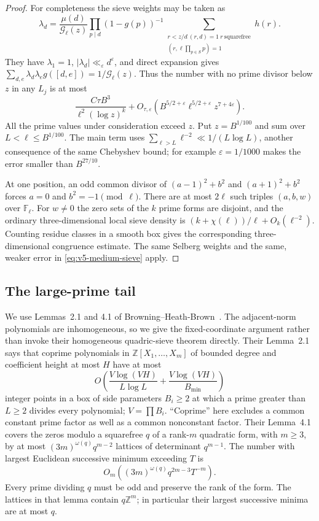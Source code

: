 \documentclass[11pt]{article}
\theoremstyle{definition}
\theoremstyle{remark}
\begin{document}
\begin{proof}
For completeness the sieve weights may be taken as
\[
 \lambda_d=\frac{\mu(d)}{\mathcal G_\ell(z)}
 \prod_{p\mid d}(1-g(p))^{-1}
 \sum_{\substack{r<z/d\ (r,d)=1\ r\ \text{squarefree}\\
                      (r,\ell\prod_{p\in S}p)=1}}h(r).
\]
They have $\lambda_1=1$, $|\lambda_d|\ll_\varepsilon d^\varepsilon$,
and direct expansion gives
$\sum_{d,e}\lambda_d\lambda_e g([d,e])=1/\mathcal G_\ell(z)$.
Thus the number with no prime divisor below $z$ in any $L_j$ is at most
\[
 \frac{C\tau B^3}{\ell^2(\log z)^k}
 +O_{\tau,\varepsilon}
  (B^{5/2+\varepsilon}\ell^{5/2+\varepsilon}z^{7+4\varepsilon}).
\]
All the prime values under consideration exceed $z$. Put $z=B^{1/100}$
and sum over $L<\ell\leq B^{1/100}$. The main term uses
$\sum_{\ell>L}\ell^{-2}\ll1/(L\log L)$, another consequence of the
same Chebyshev bound; for example
$\varepsilon=1/1000$ makes the error smaller than $B^{27/10}$.

At one position, an odd common divisor of $(a-1)^2+b^2$ and
$(a+1)^2+b^2$ forces $a=0$ and $b^2=-1\pmod\ell$.
There are at most $2\ell$ such triples $(a,b,w)$ over $\mathbb F_\ell$.
For $w\ne0$ the zero sets of the $k$ prime forms are disjoint, and the
ordinary three-dimensional local sieve density is
$(k+\chi(\ell))/\ell+O_k(\ell^{-2})$.
Counting residue classes in a smooth box gives the corresponding
three-dimensional congruence estimate. The same Selberg weights and the
same, weaker error in \eqref{eq:v5-medium-sieve} apply.
\end{proof}

\subsection{The large-prime tail}\label{subsec:v5-large-sieve}

We use Lemmas~2.1 and 4.1 of Browning--Heath-Brown~\cite{v5bhb}.
The adjacent-norm polynomials are inhomogeneous, so we give the
fixed-coordinate argument rather than invoke their homogeneous
quadric-sieve theorem directly.
Their Lemma~2.1 says that coprime polynomials in $\mathbb Z[X_1,\ldots,X_m]$
of bounded degree and coefficient height at most $H$ have at most
\begin{equation}\label{eq:v5-box-sieve}
 O\left(\frac{V\log(VH)}{L\log L}
           +\frac{V\log(VH)}{B_{\min}}\right)
\end{equation}
integer points in a box of side parameters $B_i\geq2$ at which a prime
greater than $L\geq2$ divides every polynomial; $V=\prod B_i$.
``Coprime'' here excludes a common constant prime factor as well as a
common nonconstant factor. Their Lemma~4.1 covers the zeros modulo a
squarefree $q$ of a rank-$m$ quadratic form, with $m\geq3$, by at most
$(3m)^{\omega(q)}q^{m-2}$ lattices of determinant $q^{m-1}$.
The number with largest Euclidean successive minimum exceeding $T$ is
\begin{equation}\label{eq:v5-lattice-tail}
 O_m((3m)^{\omega(q)}q^{2m-3}T^{-m}).
\end{equation}
Every prime dividing $q$ must be odd and preserve the rank of the form.
The lattices in that lemma contain $q\mathbb Z^m$; in particular their
largest successive minima are at most $q$.
\end{document}
